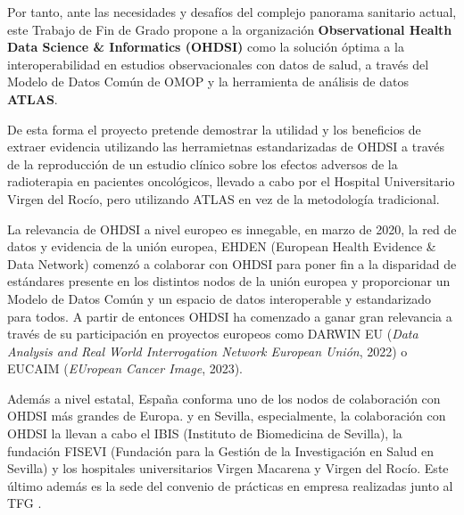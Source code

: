 Por tanto, ante las necesidades y desafíos del complejo panorama sanitario actual, este Trabajo de Fin de Grado propone a la organización \textbf{Observational Health Data Science \& Informatics (OHDSI)} como la solución óptima a la interoperabilidad en estudios observacionales con datos de salud, a través del Modelo de Datos Común de OMOP y la herramienta de análisis de datos \textbf{ATLAS}. 

De esta forma el proyecto pretende demostrar la utilidad y los beneficios de extraer evidencia utilizando las herramietnas estandarizadas de OHDSI a través de la reproducción de un estudio clínico sobre los efectos adversos de la radioterapia en pacientes oncológicos, llevado a cabo por el Hospital Universitario Virgen del Rocío, pero utilizando ATLAS en vez de la metodología tradicional.

La relevancia de OHDSI a nivel europeo es innegable, en marzo de 2020, la red de datos y evidencia de la unión europea, EHDEN (European Health Evidence \& Data Network) comenzó a colaborar con OHDSI para poner fin a la disparidad de estándares presente en los distintos nodos de la unión europea y proporcionar un Modelo de Datos Común y un espacio de datos interoperable y estandarizado para todos. A partir de entonces OHDSI ha comenzado a ganar gran relevancia a través de su participación en proyectos europeos como DARWIN EU (\textit{Data Analysis and Real World Interrogation Network European Unión}, 2022) \cite{OHDSI2023Darwin} %
o EUCAIM (\textit{EUropean Cancer Image}, 2023).%

Además a nivel estatal, España conforma uno de los nodos de colaboración con OHDSI más grandes de Europa. %
y en Sevilla, especialmente, la colaboración con OHDSI la llevan a cabo el IBIS (Instituto de Biomedicina de Sevilla), la fundación FISEVI (Fundación para la Gestión de la Investigación en Salud en Sevilla) y los hospitales universitarios Virgen Macarena y Virgen del Rocío. Este último además es la sede del convenio de prácticas en empresa realizadas junto al TFG . %



